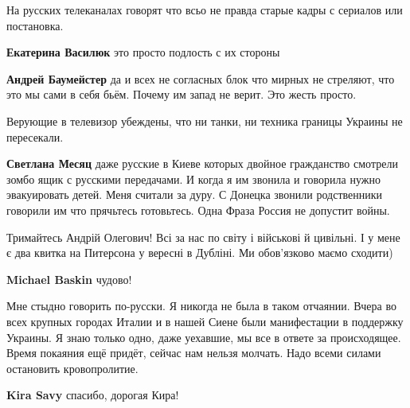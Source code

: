  
 
 
 
 
\zzSecCmt

\begin{itemize} %
На русских телеканалах говорят что всьо не правда старые кадры с сериалов или постановка.

\begin{itemize} %
\textbf{Екатерина Василюк} это просто подлость с их стороны

\textbf{Андрей Баумейстер} да и всех не согласных блок что мирных не стреляют, что это мы сами в себя бьём. Почему им запад не верит. Это жесть просто.

Верующие в телевизор убеждены, что ни танки, ни техника границы Украины не пересекали.

\textbf{Светлана Месяц} даже русские в Киеве которых двойное гражданство смотрели зомбо ящик с русскими передачами. И когда я им звонила и говорила нужно эвакуировать детей. Меня считали за дуру. С Донецка звонили родственники говорили им что прячьтесь готовьтесь. Одна Фраза Россия не допустит войны.
\end{itemize} %


Тримайтесь Андрій Олегович! Всі за нас по світу і військові й цивільні. І у
мене є два квитка на Питерсона у вересні в Дубліні. Ми обов'язково маємо
сходити)

\textbf{Michael Baskin} чудово!


Мне стыдно говорить по-русски. Я никогда не была в таком отчаянии. Вчера во
всех крупных городах Италии и в нашей Сиене были манифестации в поддержку
Украины. Я знаю только одно, даже уехавшие, мы все в ответе за происходящее.
Время покаяния ещё придёт, сейчас нам нельзя молчать. Надо всеми силами
остановить кровопролитие.

\begin{itemize} %
\textbf{Kira Savy} спасибо, дорогая Кира!


\end{itemize}
\end{itemize}
